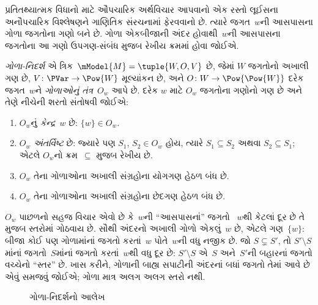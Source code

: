 \documentclass[../../../include/open-logic-section]{subfiles}
\begin{document}


પ્રતિતથ્યાત્મક વિધાનો માટે ઔપચારિક અર્થવિચાર આપવાનો એક રસ્તો લૂઈસના
અનૌપચારિક વિશ્લેષણને ગાણિતિક સંરચનામાં ફેરવવાનો છે. ત્યારે
જગત~$w$ની આસપાસના ગોળા જગતોના ગણો બને છે. ગોળા એકબીજાની અંદર
હોવાથી~$w$ની આસપાસના જગતોના આ ગણો ઉપગણ-સંબંધ મુજબ રેખીય ક્રમમાં
હોવા જોઈએ.

\begin{defn}
  \emph{ગોળા-નિદર્શ} એ ત્રિક~$\mModel{M} = \tuple{W, O, V}$ છે,
  જેમાં $W$ જગતોનો અખાલી ગણ છે, $V\colon \PVar \to \Pow{W}$
  મૂલ્યાંકન છે, અને $O\colon W \to \Pow{\Pow{W}}$ દરેક જગત~$w$ને
  \emph{ગોળાઓનું તંત્ર}~$O_w$ આપે છે. દરેક $w$ માટે $O_w$ જગતોના
  ગણોનો ગણ છે અને તેણે નીચેની શરતો સંતોષવી જોઈએ:
  \begin{enumerate}
  \item $O_w$નું \emph{કેન્દ્ર}~$w$ છે: $\{w\} \in O_w$.
  \item $O_w$ \emph{અંતર્વિષ્ટ} છે: જ્યારે પણ $S_1$, $S_2 \in O_w$
    હોય, ત્યારે $S_1 \subseteq S_2$ અથવા $S_2 \subseteq S_1$;
    એટલે $O_w$નો ક્રમ~$\subseteq$ મુજબ રેખીય છે.
  \item $O_w$ તેના ગોળાઓના અખાલી સંગ્રહોના યોગગણ હેઠળ બંધ છે.
  \item $O_w$ તેના ગોળાઓના અખાલી સંગ્રહોના છેદગણ હેઠળ બંધ છે.
  \end{enumerate}
\end{defn}

$O_w$ પાછળનો સહજ વિચાર એવો છે કે~$w$ની ``આસપાસનાં'' જગતો
~$w$થી કેટલાં દૂર છે તે મુજબ સ્તરોમાં ગોઠવાય છે. સૌથી અંદરનો
અખાલી ગોળો એકલું~$w$ છે, એટલે ગણ~$\{w\}$: બીજા કોઈ પણ ગોળામાંનાં
જગતો કરતાં~$w$ પોતે~$w$ની વધુ નજીક છે. જો $S \subsetneq S'$, તો
$S' \setminus S$માંનાં જગતો~$S$માંનાં જગતો કરતાં~$w$થી વધુ દૂર
છે: $S' \setminus S$ એ~$S$ અને~$S'$ની બહારનાં જગતો વચ્ચેનો
``સ્તર'' છે. ખાસ કરીને, ગોળાની બાહ્ય સપાટીની અંદરનાં બધાં જગતો
તેમાં આવે છે એવું સમજવું જોઈએ; ગોળા માત્ર અલગ અલગ સ્તરો નથી.

\begin{figure}
\begin{center}
\caption{ગોળા-નિદર્શનો આલેખ}
\end{center}
\end{figure}
\end{document}
